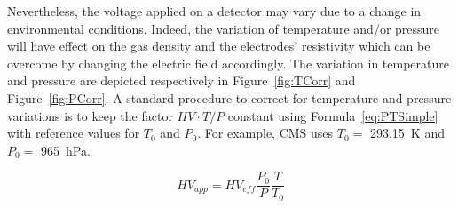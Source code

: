 	Nevertheless, the voltage applied on a detector may vary due to a change in environmental conditions. Indeed, the variation of temperature and/or pressure will have effect on the gas density and the electrodes' resistivity which can be overcome by changing the electric field accordingly. The variation in temperature and pressure are depicted respectively in Figure~\ref{fig:TCorr} and Figure~\ref{fig:PCorr}. A standard procedure to correct for temperature and pressure variations is to keep the factor $HV\cdot T/P$ constant using Formula~\ref{eq:PTSimple}~\cite{ABBRESCIA1995,ABBRESCIA1997PRES} with reference values for $T_0$ and $P_0$. For example, CMS uses $T_0=$ \SI{293.15}{K} and $P_0=$ \SI{965}{hPa}.
	
	\begin{equation}
	\label{eq:PTSimple}
	HV_{app} = HV_{eff}\frac{P_0}{P}\frac{T}{T_0}
	\end{equation}
	
